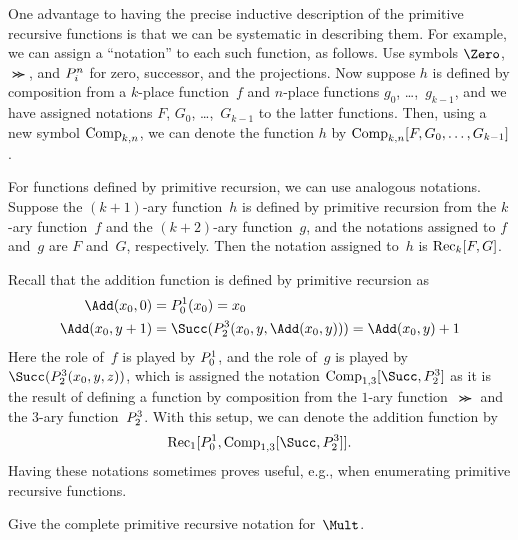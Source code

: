 \documentclass[../../../include/open-logic-section]{subfiles}
\begin{document}

One advantage to having the precise inductive description of the primitive
recursive functions is that we can be systematic in describing them.
For example, we can assign a ``notation'' to each such function, as
follows. Use symbols $\Zero$, $\Succ$, and $P^{n}_{i}$ for zero,
successor, and the projections. Now suppose $h$ is defined by
composition from a $k$-place function~$f$ and $n$-place functions $g_0$,
\dots,~$g_{k-1}$, and we have assigned notations $F$, $G_0$,
\dots,~$G_{k-1}$ to the latter functions. Then, using a new symbol
$\mathrm{Comp}_{k,n}$, we can denote the function $h$ by
$\mathrm{Comp}_{k,n}[F,G_0,\dots,G_{k-1}]$. 

For functions defined by primitive recursion, we can use analogous
notations. Suppose the $(k+1)$-ary function~$h$ is defined by
primitive recursion from the $k$-ary function~$f$ and the $(k+2)$-ary
function~$g$, and the notations assigned to $f$ and~$g$ are $F$
and~$G$, respectively. Then the notation assigned to~$h$ is
$\mathrm{Rec}_k[F,G]$. 

Recall that the addition function is defined by primitive recursion as
\begin{align*}
  \Add(x_0, 0) & = \Proj{1}{0}(x_0) = x_0\\
  \Add(x_0, y+1) & = \Succ(\Proj{3}{2}(x_0, y, \Add(x_0, y))) = \Add(x_0, y) +1
\end{align*}
Here the role of~$f$ is played by $P^{1}_{0}$, and the role of~$g$
is played by $\Succ(\Proj{3}{2}(x_0, y, z))$, which is assigned the
notation $\fn{Comp}_{1,3}[\Succ,\Proj{3}{2}]$ as it is the result of
defining a function by composition from the $1$-ary function~$\Succ$
and the $3$-ary function~$P^{3}_{2}$. With this setup, we can denote
the addition function by
\[
\fn{Rec}_1[\Proj{1}{0},\fn{Comp}_{1,3}[\Succ,\Proj{3}{2}]].
\]
Having these notations sometimes proves useful, e.g., when enumerating
primitive recursive functions.

\begin{prob}
  Give the complete primitive recursive notation for~$\Mult$.
\end{prob}
\end{document}
